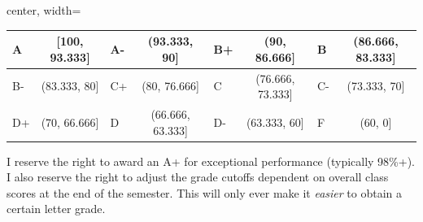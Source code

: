 \documentclass[11pt]{article}
\begin{document}
\begin{center}
    \begin{minipage}[t]{.95\textwidth}
\begin{center}
 \begin{adjustbox}{center, width=\columnwidth-10pt}
\renewcommand{\arraystretch}{2}
\begin{tabular}{lclclclc}
 A & {[}100, 93.333] & A- & (93.333, 90]& B+ & (90, 86.666] & B & (86.666, 83.333] \\ 
 \hline
 B- & (83.333, 80] & C+ & (80, 76.666] & C&  (76.666, 73.333] & C-&  (73.333, 70] \\
 
 \hline
D+ & (70, 66.666]& D & (66.666, 63.333]& D- & (63.333, 60] & F & (60, 0]\\
\end{tabular}
\end{adjustbox}
\end{center}
\end{minipage}
\end{center}

I reserve the right to award an A+ for exceptional performance (typically 98\%+). I also reserve the right to adjust the grade cutoffs dependent on overall class scores at the end of the semester. This will only ever make it \textit{easier} to obtain a certain letter grade. 
\end{document}
